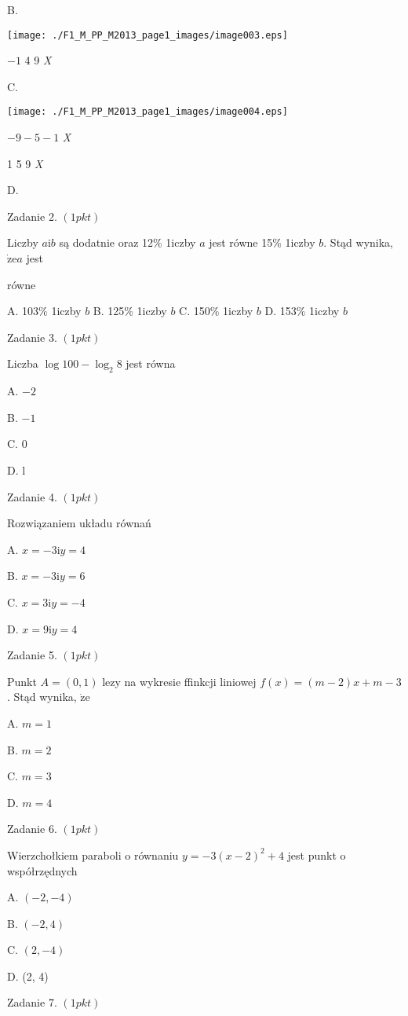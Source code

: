 \documentclass[a4paper,12pt]{article}
\begin{document}
B.
\begin{center}
\texttt{[image: ./F1\_M\_PP\_M2013\_page1\_images/image003.eps]}
\end{center}
$-1$  4 9  {\it X}

C.
\begin{center}
\texttt{[image: ./F1\_M\_PP\_M2013\_page1\_images/image004.eps]}
\end{center}
$-9  -5  -1$  {\it X}

1 5  9  {\it X}

D.

Zadanie 2. $(1pkt)$

Liczby $a\mathrm{i}b$ są dodatnie oraz 12\% 1iczby $a$ jest równe 15\% 1iczby $b$. Stąd wynika, $\dot{\mathrm{z}}\mathrm{e}a$ jest

równe

A. 103\% 1iczby $b$ B. 125\% 1iczby $b$ C. 150\% 1iczby $b$ D. 153\% 1iczby $b$

Zadanie 3. $(1pkt)$

Liczba $\log 100-\log_{2}8$ jest równa

A. $-2$

B. $-1$

C. 0

D. l

Zadanie 4. $(1pkt)$

Rozwiązaniem układu równań 

A. $x=-3 \mathrm{i}y=4$

B. $x=-3 \mathrm{i}y=6$

C. $x=3 \mathrm{i}y=-4$

D. $x=9 \mathrm{i}y=4$

Zadanie 5. $(1pkt)$

Punkt $A=(0,1)$ lezy na wykresie ffinkcji liniowej $f(x)=(m-2)x+m-3$. Stąd wynika, $\dot{\mathrm{z}}\mathrm{e}$

A. $m=1$

B. $m=2$

C. $m=3$

D. $m=4$

Zadanie 6. $(1pkt)$

Wierzchołkiem paraboli o równaniu $y=-3(x-2)^{2}+4$ jest punkt o współrzędnych

A. $(-2,-4)$

B. $(-2,4)$

C. $(2,-4)$

D. (2, 4)

Zadanie 7. $(1pkt)$
\end{document}
